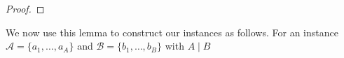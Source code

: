 \begin{proof}
%
%
%
%
%
%
%
%
\end{proof}

We now use this lemma to construct our instances as follows.
For an \ov{} instance $\mathcal{A} = \{a_1, \ldots, a_A\}$ and $\mathcal{B} = \{b_1, \ldots, b_B\}$ with $A \mid B$



